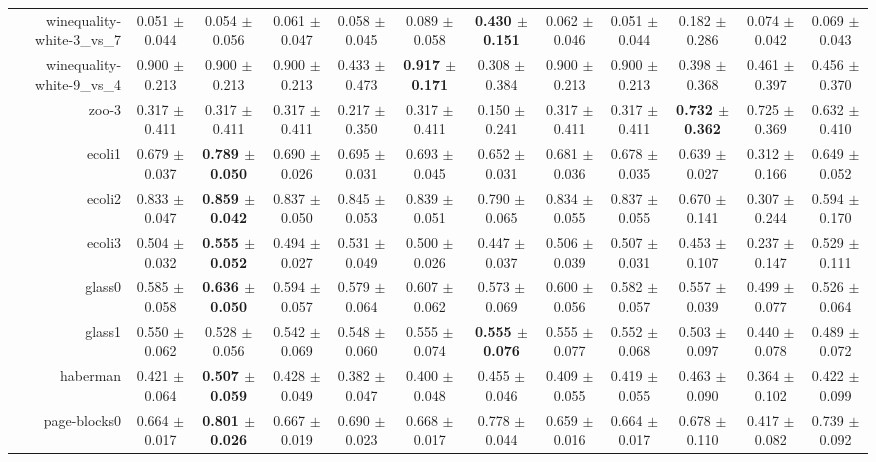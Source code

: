 \begin{table}[!ht]
{\begin{tabular}{r c c c c c c c c c c c}
winequality-white-3\_vs\_7 & 0.051 $\pm$ 0.044 & 0.054 $\pm$ 0.056 & 0.061 $\pm$ 0.047 & 0.058 $\pm$ 0.045 & 0.089 $\pm$ 0.058 & \textbf{0.430 $\pm$ 0.151} & 0.062 $\pm$ 0.046 & 0.051 $\pm$ 0.044 & 0.182 $\pm$ 0.286 & 0.074 $\pm$ 0.042 & 0.069 $\pm$ 0.043 \\
winequality-white-9\_vs\_4 & 0.900 $\pm$ 0.213 & 0.900 $\pm$ 0.213 & 0.900 $\pm$ 0.213 & 0.433 $\pm$ 0.473 & \textbf{0.917 $\pm$ 0.171} & 0.308 $\pm$ 0.384 & 0.900 $\pm$ 0.213 & 0.900 $\pm$ 0.213 & 0.398 $\pm$ 0.368 & 0.461 $\pm$ 0.397 & 0.456 $\pm$ 0.370 \\
zoo-3 & 0.317 $\pm$ 0.411 & 0.317 $\pm$ 0.411 & 0.317 $\pm$ 0.411 & 0.217 $\pm$ 0.350 & 0.317 $\pm$ 0.411 & 0.150 $\pm$ 0.241 & 0.317 $\pm$ 0.411 & 0.317 $\pm$ 0.411 & \textbf{0.732 $\pm$ 0.362} & 0.725 $\pm$ 0.369 & 0.632 $\pm$ 0.410 \\
ecoli1 & 0.679 $\pm$ 0.037 & \textbf{0.789 $\pm$ 0.050} & 0.690 $\pm$ 0.026 & 0.695 $\pm$ 0.031 & 0.693 $\pm$ 0.045 & 0.652 $\pm$ 0.031 & 0.681 $\pm$ 0.036 & 0.678 $\pm$ 0.035 & 0.639 $\pm$ 0.027 & 0.312 $\pm$ 0.166 & 0.649 $\pm$ 0.052 \\
ecoli2 & 0.833 $\pm$ 0.047 & \textbf{0.859 $\pm$ 0.042} & 0.837 $\pm$ 0.050 & 0.845 $\pm$ 0.053 & 0.839 $\pm$ 0.051 & 0.790 $\pm$ 0.065 & 0.834 $\pm$ 0.055 & 0.837 $\pm$ 0.055 & 0.670 $\pm$ 0.141 & 0.307 $\pm$ 0.244 & 0.594 $\pm$ 0.170 \\
ecoli3 & 0.504 $\pm$ 0.032 & \textbf{0.555 $\pm$ 0.052} & 0.494 $\pm$ 0.027 & 0.531 $\pm$ 0.049 & 0.500 $\pm$ 0.026 & 0.447 $\pm$ 0.037 & 0.506 $\pm$ 0.039 & 0.507 $\pm$ 0.031 & 0.453 $\pm$ 0.107 & 0.237 $\pm$ 0.147 & 0.529 $\pm$ 0.111 \\
glass0 & 0.585 $\pm$ 0.058 & \textbf{0.636 $\pm$ 0.050} & 0.594 $\pm$ 0.057 & 0.579 $\pm$ 0.064 & 0.607 $\pm$ 0.062 & 0.573 $\pm$ 0.069 & 0.600 $\pm$ 0.056 & 0.582 $\pm$ 0.057 & 0.557 $\pm$ 0.039 & 0.499 $\pm$ 0.077 & 0.526 $\pm$ 0.064 \\
glass1 & 0.550 $\pm$ 0.062 & 0.528 $\pm$ 0.056 & 0.542 $\pm$ 0.069 & 0.548 $\pm$ 0.060 & 0.555 $\pm$ 0.074 & \textbf{0.555 $\pm$ 0.076} & 0.555 $\pm$ 0.077 & 0.552 $\pm$ 0.068 & 0.503 $\pm$ 0.097 & 0.440 $\pm$ 0.078 & 0.489 $\pm$ 0.072 \\
haberman & 0.421 $\pm$ 0.064 & \textbf{0.507 $\pm$ 0.059} & 0.428 $\pm$ 0.049 & 0.382 $\pm$ 0.047 & 0.400 $\pm$ 0.048 & 0.455 $\pm$ 0.046 & 0.409 $\pm$ 0.055 & 0.419 $\pm$ 0.055 & 0.463 $\pm$ 0.090 & 0.364 $\pm$ 0.102 & 0.422 $\pm$ 0.099 \\
page-blocks0 & 0.664 $\pm$ 0.017 & \textbf{0.801 $\pm$ 0.026} & 0.667 $\pm$ 0.019 & 0.690 $\pm$ 0.023 & 0.668 $\pm$ 0.017 & 0.778 $\pm$ 0.044 & 0.659 $\pm$ 0.016 & 0.664 $\pm$ 0.017 & 0.678 $\pm$ 0.110 & 0.417 $\pm$ 0.082 & 0.739 $\pm$ 0.092 \\

\end{tabular}}
\end{table}
